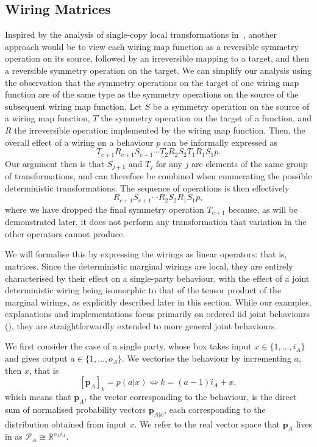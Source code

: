 \documentclass[10pt, a4paper]{article}
\numberwithin{equation}{section} %
\theoremstyle{definition}
\theoremstyle{plain}
\newcommand{\dintv}[2]{\mathopen\{#1,\ldots,#2\mathclose\}}
\newcommand{\?}{\mathrel{?}} %
\newcommand{\R}{\mathbb{R}} %
\newcommand{\cvec}[1]{\boldsymbol{\mathbf{#1}}}    %
\newcommand{\matr}[2][]{\left[\mathbf{#2}#1\right]} %
\newcommand{\sP}{\mathcal{P}}
\begin{document}
              \subsection{Wiring Matrices}\label{sec:locwir_mat}

              Inspired by the analysis of single-copy local transformations in~\cite{LocalTransformations}, another approach would be to view each wiring map function as a reversible symmetry operation on its source, followed by an irreversible mapping to a target, and then a reversible symmetry operation on the target. We can simplify our analysis using the observation that the symmetry operations on the target of one wiring map function are of the same type as the symmetry operations on the source of the subsequent wiring map function. Let \(S\) be a symmetry operation on the source of a wiring map function, \(T\) the symmetry operation on the target of a function, and \(R\) the irreversible operation implemented by the wiring map function. Then, the overall effect of a wiring on a behaviour \(p\) can be informally expressed as
              \[ T_{c+1}R_{c+1}S_{c+1} \cdots T_2R_2S_2 T_1R_1S_1 p. \]
              Our argument then is that \(S_{j+1}\) and \(T_{j}\) for any \(j\) are elements of the same group of transformations, and can therefore be combined when enumerating the possible deterministic transformations. The sequence of operations is then effectively
              \[ R_{c+1}S_{c+1} \cdots R_2S_2 R_1S_1 p, \]
              where we have dropped the final symmetry operation \(T_{c+1}\) because, as will be demonstrated later, it does not perform any transformation that variation in the other operators cannot produce.

              We will formalise this by expressing the wirings as linear operators: that is, matrices. Since the deterministic marginal wirings are local, they are entirely characterised by their effect on a single-party behaviour, with the effect of a joint deterministic wiring being isomorphic to that of the tensor product of the marginal wirings, as explicitly described later in this section. While our examples, explanations and implementations focus primarily on ordered iid joint behaviours (), they are straightforwardly extended to more general joint behaviours.

              We first consider the case of a single party, whose box takes input \(x \in \dintv{1}{i_A}\) and gives output \(a \in \dintv{1}{o_A}\). We vectorise the behaviour by incrementing \(a\), then \(x\), that is
              \begin{equation}
                \matr[_A]{p}_k = p(a|x) \Leftrightarrow k = (a-1) i_A + x,
              \end{equation}
              which means that \(\cvec{p}_A\), the vector corresponding to the behaviour, is the direct sum of normalised probability vectors \(\cvec{p}_{A|x}\), each corresponding to the distribution obtained from input \(x\). We refer to the real vector space that \(\cvec{p}_A\) lives in as \(\sP_A \cong \R^{o_Ai_A}\).
\end{document}
